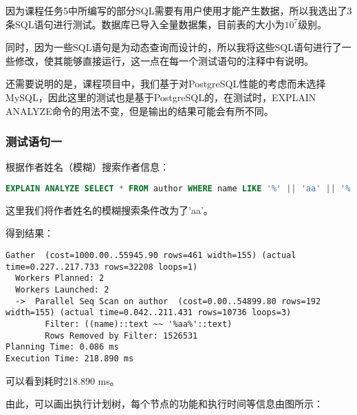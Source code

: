 \documentclass{article}
\begin{document}
因为课程任务5中所编写的部分SQL需要有用户使用才能产生数据，所以我选出了3条SQL语句进行测试。数据库已导入全量数据集，目前表的大小为$10^7$级别。

同时，因为一些SQL语句是为动态查询而设计的，所以我将这些SQL语句进行了一些修改，使其能够直接运行，这一点在每一个测试语句的注释中有说明。

还需要说明的是，课程项目中，我们基于对PostgreSQL性能的考虑而未选择MySQL，因此这里的测试也是基于PostgreSQL的，在测试时，EXPLAIN ANALYZE命令的用法不变，但是输出的结果可能会有所不同。

\subsubsection{测试语句一}

根据作者姓名（模糊）搜索作者信息：
\begin{lstlisting}[language=sql]
EXPLAIN ANALYZE SELECT * FROM author WHERE name LIKE '%' || 'aa' || '%';
\end{lstlisting}

这里我们将作者姓名的模糊搜索条件改为了'aa'。

得到结果：

\begin{lstlisting}
Gather  (cost=1000.00..55945.90 rows=461 width=155) (actual time=0.227..217.733 rows=32208 loops=1)
  Workers Planned: 2
  Workers Launched: 2
  ->  Parallel Seq Scan on author  (cost=0.00..54899.80 rows=192 width=155) (actual time=0.042..211.431 rows=10736 loops=3)
        Filter: ((name)::text ~~ '%aa%'::text)
        Rows Removed by Filter: 1526531
Planning Time: 0.086 ms
Execution Time: 218.890 ms
\end{lstlisting}

可以看到耗时218.890 ms。

由此，可以画出执行计划树，每个节点的功能和执行时间等信息由图所示：

\begin{center}
\end{center}
\end{document}
